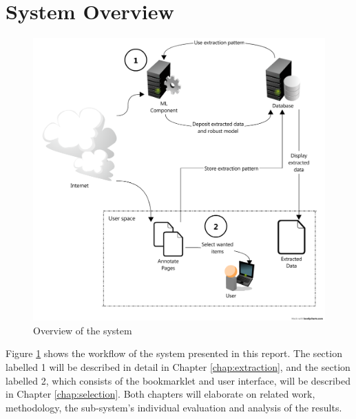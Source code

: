\section{System Overview}
\begin{figure}[htbp]
\centering
\includegraphics[scale=0.35]{parcels.png} 
\caption{Overview of the system}
\label{fig:architecture}
\end{figure}

Figure \ref{fig:architecture} shows the workflow of the system presented in this report.
The section labelled 1 will be described in detail in Chapter \ref{chap:extraction}, and the section labelled 2, which consists of the bookmarklet and user interface, will be described in Chapter \ref{chap:selection}. Both chapters will elaborate on related work, methodology, the sub-system's individual evaluation and analysis of the results.
